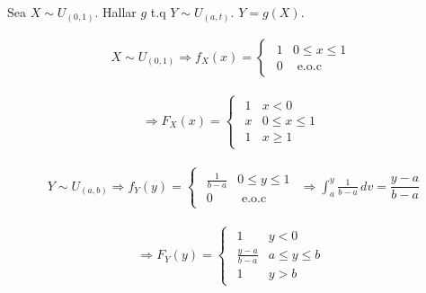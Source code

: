 \begin{Ejem} Sea $X \sim  U_{\left(0,1\right)}$. Hallar $g$ t.q $Y\sim U_{\left(a,t\right) }$. $Y=g\left(X\right)$.

\begin{eqnarray*}
X\sim U_{\left(0,1\right)} \Rightarrow f_{X}\left(x\right) =
\begin{cases}
\begin{array}{lc}
1  & 0\leq x \leq 1 \\
0 & \textrm{ e.o.c}
\end{array}
\end{cases}
\end{eqnarray*}

\begin{eqnarray*}
\Rightarrow  F_{X}\left(x\right)=
\begin{cases}
\begin{array}{lc}
1  & x<0 \\
x & 0\leq x \leq 1 \\
1 & x \geq 1
\end{array}
\end{cases}
\end{eqnarray*}

\begin{eqnarray*}
Y\sim U_{\left(a,b\right)}\Rightarrow f_{Y}\left(y\right)=
\begin{cases}
\begin{array}{lc}
\frac{1}{b-a}  & 0\leq y \leq 1 \\
0 & \textrm{ e.o.c}
\end{array}
\end{cases}
\Rightarrow \int_{a}^{y}\frac{1}{b-a} \, dv = \dfrac{y-a}{b-a} 
\end{eqnarray*}

\begin{eqnarray*}
\Rightarrow  F_{Y}\left(y\right)=
\begin{cases}
\begin{array}{lc}
1  & y<0 \\
\frac{y-a}{b-a} & a\leq y \leq b \\
1 & y > b
\end{array}
\end{cases}
\end{eqnarray*}


\end{Ejem}
